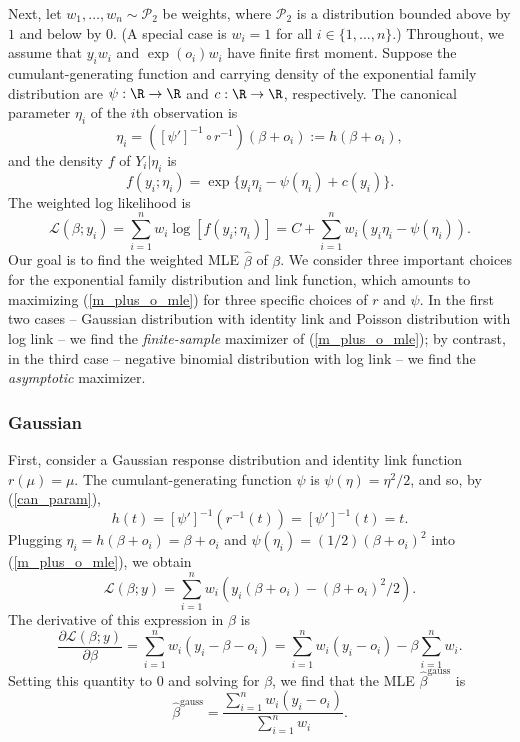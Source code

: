 \documentclass[12pt]{article}
\begin{document}
\begin{appendices}
Next, let $w_1, \dots, w_n \sim \mathcal{P}_2$ be weights, where $\mathcal{P}_2$ is a distribution bounded above by $1$ and below by $0$. (A special case is $w_i = 1$ for all $i \in \{1, \dots, n\}$.) Throughout, we assume that $y_iw_i$ and $\exp(o_i)w_i$ have finite first moment.  Suppose the cumulant-generating function and carrying density of the exponential family distribution are $\psi:\R \to \R$ and $c: \R \to \R$, respectively. The canonical parameter $\eta_i$ of the $i$th observation is 
\begin{equation}\label{can_param}
\eta_i = ([\psi']^{-1} \circ r^{-1})(\beta + o_i) := h(\beta + o_i),
\end{equation}
 and the density $f$ of $Y_i | \eta_i$ is
$$f(y_i; \eta_i) = \exp\{y_i \eta_i - \psi(\eta_i) + c(y_i)\}.$$ The weighted log likelihood is
\begin{equation}\label{m_plus_o_mle}
\mathcal{L}(\beta;y_i) = \sum_{i=1}^n w_i\log\left[f(y_i;\eta_i)\right] = C + \sum_{i=1}^n w_i(y_i \eta _i - \psi(\eta_i)).
\end{equation}
Our goal is to find the weighted MLE $\hat{\beta}$ of $\beta$. We consider three important choices for the exponential family distribution and link function, which amounts to maximizing (\ref{m_plus_o_mle}) for three specific choices of $r$ and $\psi$. In the first two cases -- Gaussian distribution with identity link and Poisson distribution with log link -- we find the \textit{finite-sample} maximizer of (\ref{m_plus_o_mle}); by contrast, in the third case -- negative binomial distribution with log link -- we find the \textit{asymptotic} maximizer.

\subsubsection*{Gaussian}
First, consider a Gaussian response distribution and identity link function $r(\mu) = \mu$. The cumulant-generating function $\psi$ is $\psi(\eta) = \eta^2/2$, and so, by (\ref{can_param}),
$$h(t) = [\psi']^{-1}( r^{-1}(t)) = [\psi']^{-1}(t) = t.$$
Plugging $\eta_i = h(\beta + o_i) = \beta + o_i$ and $\psi(\eta_i) = (1/2)(\beta + o_i)^2$ into (\ref{m_plus_o_mle}), we obtain
$$\mathcal{L}(\beta; y) = \sum_{i=1}^n w_i (y_i(\beta + o_i) - (\beta + o_i)^2/2).$$ The derivative of this expression in $\beta$ is
$$\frac{\partial \mathcal{L}(\beta;y)}{\partial\beta} = \sum_{i=1}^n w_i (y_i - \beta - o_i) = \sum_{i=1}^n w_i(y_i - o_i) - \beta \sum_{i=1}^n w_i.$$ Setting this quantity to 0 and solving for $\beta$, we find that the MLE $\hat{\beta}^\textrm{gauss}$ is
$$\hat{\beta}^\textrm{gauss} = \frac{\sum_{i=1}^n w_i (y_i - o_i)}{\sum_{i=1}^n w_i}.$$


\end{appendices}
\end{document}

